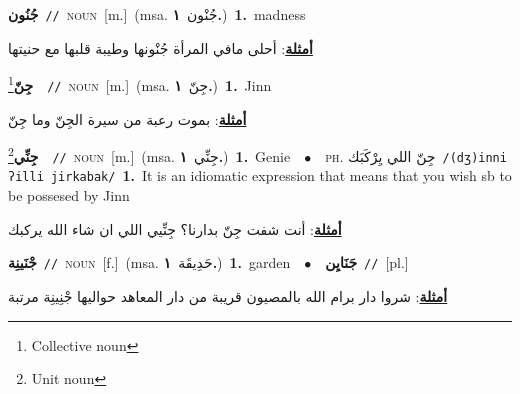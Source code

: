 \documentclass[10pt,a4paper,twoside]{article} %
\begin{document}
\begin{multicols}{2}
{\setlength\topsep{0pt}\textbf{\foreignlanguage{arabic}{جُنُون}}\ {\color{gray}\texttt{//}\color{black}}\ \textsc{noun}\ [m.]\ \color{gray}(msa. \foreignlanguage{arabic}{جُنْون}~\foreignlanguage{arabic}{\textbf{١.}})\color{black}\ \textbf{1.}~madness\  \begin{flushright}\color{gray}\foreignlanguage{arabic}{\textbf{\underline{\foreignlanguage{arabic}{أمثلة}}}: أحلى مافي المرأة جُنْونها وطيبة قلبها مع حنيتها}\end{flushright}\color{black}} \vspace{2mm}

{\setlength\topsep{0pt}\textbf{\foreignlanguage{arabic}{جِنّ}}\footnote{Collective noun}\ \ {\color{gray}\texttt{//}\color{black}}\ \textsc{noun}\ [m.]\ \color{gray}(msa. \foreignlanguage{arabic}{جِنّ}~\foreignlanguage{arabic}{\textbf{١.}})\color{black}\ \textbf{1.}~Jinn\  \begin{flushright}\color{gray}\foreignlanguage{arabic}{\textbf{\underline{\foreignlanguage{arabic}{أمثلة}}}: بموت رعبة من سيرة الجِنّ وما جِنّ}\end{flushright}\color{black}} \vspace{2mm}

{\setlength\topsep{0pt}\textbf{\foreignlanguage{arabic}{جِنِّي}}\footnote{Unit noun}\ \ {\color{gray}\texttt{//}\color{black}}\ \textsc{noun}\ [m.]\ \color{gray}(msa. \foreignlanguage{arabic}{جِنِّي}~\foreignlanguage{arabic}{\textbf{١.}})\color{black}\ \textbf{1.}~Genie\ \ $\bullet$\ \ \textsc{ph.} \color{gray} \foreignlanguage{arabic}{جِنّ اللي يِرْكَبَك}\color{black}\ {\color{gray}\texttt{/{\sffamily (dʒ)inni ʔilli jirkabak}/}\color{black}}\ \textbf{1.}~It is an idiomatic expression that means that you wish sb to be possesed by Jinn\  \begin{flushright}\color{gray}\foreignlanguage{arabic}{\textbf{\underline{\foreignlanguage{arabic}{أمثلة}}}: أنت شفت جِنّ بدارنا؟ جِنِّيي اللي ان شاء الله يركبك}\end{flushright}\color{black}} \vspace{2mm}

{\setlength\topsep{0pt}\textbf{\foreignlanguage{arabic}{جْنَينِة}}\ {\color{gray}\texttt{//}\color{black}}\ \textsc{noun}\ [f.]\ \color{gray}(msa. \foreignlanguage{arabic}{حَدِيقَة}~\foreignlanguage{arabic}{\textbf{١.}})\color{black}\ \textbf{1.}~garden\ \ $\bullet$\ \ \setlength\topsep{0pt}\textbf{\foreignlanguage{arabic}{جَنَايِن}}\ {\color{gray}\texttt{//}\color{black}}\ [pl.]\  \begin{flushright}\color{gray}\foreignlanguage{arabic}{\textbf{\underline{\foreignlanguage{arabic}{أمثلة}}}: شروا دار برام الله بالمصيون قريبة من دار المعاهد حواليها جْنِينِة مرتبة}\end{flushright}\color{black}} \vspace{2mm}


\end{multicols}
\end{document}
